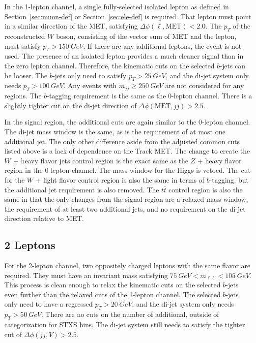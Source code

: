 In the 1-lepton channel, a single fully-selected isolated lepton as defined in
Section~\ref{sec:muon-def} or Section~\ref{sec:ele-def} is required.
That lepton must point in a similar direction of the MET,
satisfying $\Delta \phi(\ell, \mathrm{MET}) < 2.0$.
The $p_T$ of the reconstructed $W$ boson, consisting of the vector sum of MET and the lepton,
must satisfy $p_T > \SI{150}{GeV}$.
If there are any additional leptons, the event is not used.
The presence of an isolated lepton provides
a much cleaner signal than in the zero lepton channel.
Therefore, the kinematic cuts on the selected $b$-jets can be looser.
The $b$-jets only need to satisfy $p_T > \SI{25}{GeV}$,
and the di-jet system only needs $p_T > \SI{100}{GeV}$.
Any events with $m_{jj} \ge \SI{250}{GeV}$ are not considered for any regions.
The $b$-tagging requirement is the same as the 0-lepton channel.
There is a slightly tighter cut on the di-jet direction of $\Delta\phi(\mathrm{MET}, jj) > 2.5$.

In the signal region, the additional cuts are again similar to the 0-lepton channel.
The di-jet mass window is the same, as is the requirement of at most one additional jet.
The only other difference aside from the adjusted common cuts listed above
is a lack of dependence on the Track MET.
The change to create the $W$ + heavy flavor jets control region is the exact same as the
$Z$ + heavy flavor region in the 0-lepton channel.
The mass window for the Higgs is vetoed.
The cut for the $W$ + light flavor control region is also the same in terms of $b$-tagging,
but the additional jet requirement is also removed.
The $t\bar{t}$ control region is also the same in that the only changes from the signal region
are a relaxed mass window, the requirement of at least two additional jets,
and no requirement on the di-jet direction relative to MET.

\subsection{2 Leptons}

For the 2-lepton channel, two oppositely charged leptons with the same flavor are required.
They must have an invariant mass satisfying $\SI{75}{GeV} < m_{\ell\ell} < \SI{105}{GeV}$.
This process is clean enough to relax the kinematic cuts on the selected $b$-jets
even further than the relaxed cuts of the 1-lepton channel.
The selected $b$-jets only need to have a regressed $p_T > \SI{20}{GeV}$,
and the di-jet system only needs $p_T > \SI{50}{GeV}$.
There are no cuts on the number of additional, outside of categorization for STXS bins.
The di-jet system still needs to satisfy the tighter cut of $\Delta\phi(jj,V) > 2.5$.

